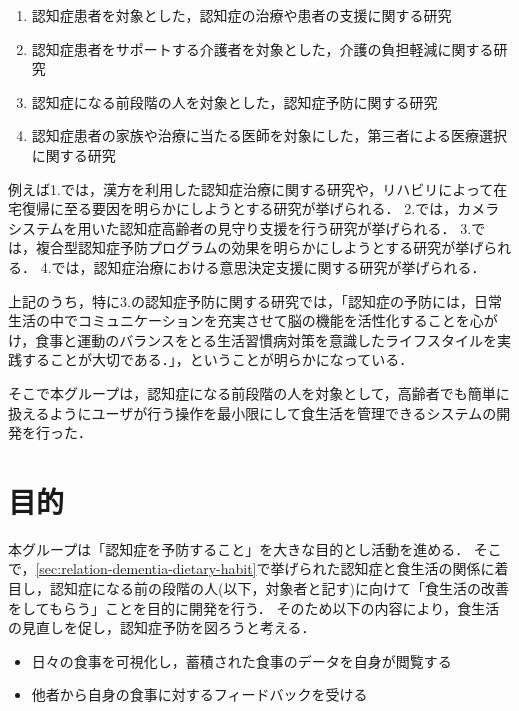 \documentclass[../report]{subfiles}
\begin{document}
\begin{enumerate}
    \item 認知症患者を対象とした，認知症の治療や患者の支援に関する研究
    \item 認知症患者をサポートする介護者を対象とした，介護の負担軽減に関する研究
    \item 認知症になる前段階の人を対象とした，認知症予防に関する研究
    \item 認知症患者の家族や治療に当たる医師を対象にした，第三者による医療選択に関する研究
\end{enumerate}

例えば1.では，漢方を利用した認知症治療に関する研究\cite{dementia-prevention-with-chinese-medicine}や，リハビリによって在宅復帰に至る要因を明らかにしようとする研究\cite{rehabilitation}が挙げられる．
2.では，カメラシステムを用いた認知症高齢者の見守り支援を行う研究\cite{camera-system}が挙げられる．
3.では，複合型認知症予防プログラムの効果を明らかにしようとする研究\cite{dementia-prevention-with-some-programs}が挙げられる．
4.では，認知症治療における意思決定支援に関する研究\cite{medical-choice}が挙げられる．

上記のうち，特に3.の認知症予防に関する研究では，「認知症の予防には，日常生活の中でコミュニケーションを充実させて脳の機能を活性化することを心がけ，食事と運動のバランスをとる生活習慣病対策を意識したライフスタイルを実践することが大切である．」\cite{dementia-prevention}，ということが明らかになっている．

そこで本グループは，認知症になる前段階の人を対象として，高齢者でも簡単に扱えるようにユーザが行う操作を最小限にして食生活を管理できるシステムの開発を行った．


\section{目的} \label{sec:objective}
本グループは「認知症を予防すること」を大きな目的とし活動を進める．
そこで，\ref{sec:relation-dementia-dietary-habit}で挙げられた認知症と食生活の関係に着目し，認知症になる前の段階の人(以下，対象者と記す)に向けて「食生活の改善をしてもらう」ことを目的に開発を行う．
そのため以下の内容により，食生活の見直しを促し，認知症予防を図ろうと考える．

\begin{itemize}
    \item 日々の食事を可視化し，蓄積された食事のデータを自身が閲覧する
    \item 他者から自身の食事に対するフィードバックを受ける
\end{itemize}
\end{document}
